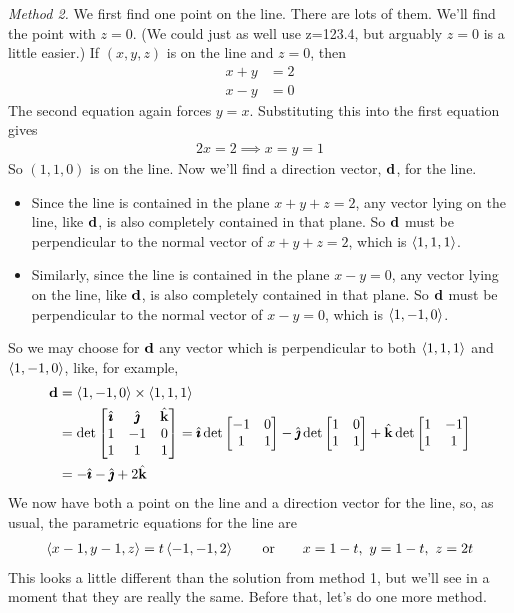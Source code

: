 \begin{eg}
\smallskip
\noindent\emph{Method 2.} We first find one point on the line. There
are lots of them. We'll find the point with $z=0$. (We could just as well
use z=123.4, but arguably $z=0$ is a little easier.) If  $(x,y,z)$ is 
on the line and $z=0$, then
\begin{align*}
x+y&=2\\
x-y&=0
\end{align*}
The second equation again forces $y=x$. Substituting this into the first 
equation gives
\begin{align*}
2x=2 \implies x=y=1
\end{align*}
So $(1,1,0)$ is on the line. Now we'll find a direction vector, $\mathbf{d}$,
for the line. 
\begin{itemize}
\item 
Since the line is contained in the plane $x+y+z=2$,
any vector lying on the line, like $\mathbf{d}$, is also completely contained
in that plane. So $\mathbf{d}$ must be perpendicular to the normal vector of
$x+y+z=2$, which is $\left< 1,1,1\right> $. 
\item
Similarly, since the line is 
contained in the plane $x-y=0$, any vector lying on the line, like $\mathbf{d}$, is also completely contained in that plane.  So $\mathbf{d}$ must be perpendicular to 
the normal vector of $x-y=0$, which is $\left< 1,-1,0\right> $. 
\end{itemize}
So we may choose for
$\mathbf{d}$ any vector which is perpendicular to both $\left< 1,1,1\right> $ and 
$\left< 1,-1,0\right>$, like, for example,
\begin{align*}
\mathbf{d}&=\left< 1,-1,0\right> \times\left< 1,1,1\right> \\
&=\det\left[ \begin{matrix}\hat{\pmb{\imath}} &\hat{\pmb{\jmath}}&\hat{\mathbf{k}}\\ 1&-1&0\\ 1&1&1\end{matrix}\right]
=\hat{\pmb{\imath}}\det\left[\begin{matrix}-1&0\\1&1\end{matrix}\right]
-\hat{\pmb{\jmath}}\det\left[\begin{matrix}1&0\\ 1&1\end{matrix}\right]
+\hat{\mathbf{k}}\det\left[\begin{matrix}1&-1\\ 1&1\end{matrix}\right]\\
&=-\hat{\pmb{\imath}}-\hat{\pmb{\jmath}}+2\hat{\mathbf{k}}
\end{align*}
We now have both a point on the line and a direction vector for the line,
so, as usual, the parametric equations for the line are
\begin{align*}
\left< x-1,y-1,z\right> =t\left< -1,-1,2\right> \qquad\text{or}\qquad
x=1-t,\ y=1-t,\ z=2t
\end{align*}
This looks a little different than the solution from method 1, but we'll see in a moment that they are really the same. Before that, let's do one more method. 


\end{eg}
